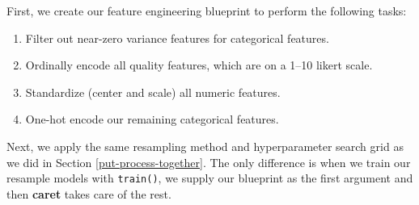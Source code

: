 \documentclass[]{krantz}
\makeatletter
\newenvironment{Shaded}{\begin{snugshade}}{\end{snugshade}}
\newcommand{\DataTypeTok}[1]{\textcolor[rgb]{0.27,0.27,0.27}{#1}}
\newcommand{\KeywordTok}[1]{\textcolor[rgb]{0.27,0.27,0.27}{\textbf{#1}}}
\newcommand{\NormalTok}[1]{#1}
\newcommand{\OperatorTok}[1]{\textcolor[rgb]{0.43,0.43,0.43}{\textbf{#1}}}
\newcommand{\OtherTok}[1]{\textcolor[rgb]{0.37,0.37,0.37}{#1}}
\newcommand{\StringTok}[1]{\textcolor[rgb]{0.5,0.5,0.5}{#1}}
\providecommand{\tightlist}{%
  \setlength{\itemsep}{0pt}\setlength{\parskip}{0pt}}
\newenvironment{kframe}{%
\medskip{}
\setlength{\fboxsep}{.8em}
 \def\at@end@of@kframe{}%
 \ifinner\ifhmode%
  \def\at@end@of@kframe{\end{minipage}}%
  \begin{minipage}{\columnwidth}%
 \fi\fi%
 \def\FrameCommand##1{\hskip\@totalleftmargin \hskip-\fboxsep
 \colorbox{shadecolor}{##1}\hskip-\fboxsep
     \hskip-\linewidth \hskip-\@totalleftmargin \hskip\columnwidth}%
 \MakeFramed {\advance\hsize-\width
   \@totalleftmargin\z@ \linewidth\hsize
   \@setminipage}}%
 {\par\unskip\endMakeFramed%
 \at@end@of@kframe}
\renewenvironment{Shaded}{\begin{kframe}}{\end{kframe}}
\makeatother
\begin{document}
First, we create our feature engineering blueprint to perform the following tasks:

\begin{enumerate}
\def\labelenumi{\arabic{enumi}.}
\tightlist
\item
  Filter out near-zero variance features for categorical features.
\item
  Ordinally encode all quality features, which are on a 1--10 likert scale.
\item
  Standardize (center and scale) all numeric features.
\item
  One-hot encode our remaining categorical features.
\end{enumerate}

\begin{Shaded}
\end{Shaded}

Next, we apply the same resampling method and hyperparameter search grid as we did in Section \ref{put-process-together}. The only difference is when we train our resample models with \texttt{train()}, we supply our blueprint as the first argument and then \textbf{caret} takes care of the rest.
\end{document}
